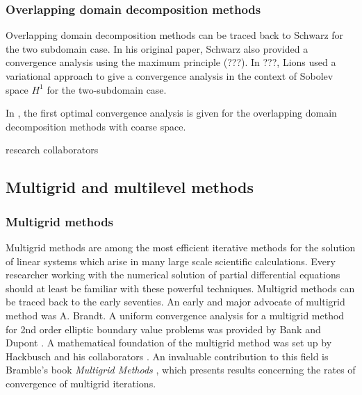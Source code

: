 \documentclass[CJK,11pt]{amsart}
\theoremstyle{definition}
\begin{document}
\begin{CJK*}{UTF8}{gbsn}
\subsubsection{Overlapping domain decomposition methods}
Overlapping domain decomposition methods can be traced back to Schwarz
\cite{} for the two subdomain case.  In his original paper, Schwarz
also provided a convergence analysis using the maximum principle (???).
In ???, Lions used a variational approach to give a convergence
analysis in the context of Sobolev space $H^1$ for the two-subdomain
case.


In \cite{bramble1991convergence-b}, the first optimal convergence
analysis is given for the overlapping domain decomposition methods
with coarse space.

 { research collaborators}

\subsection{Multigrid and multilevel methods}

\subsubsection{Multigrid methods}  Multigrid methods are among the most efficient iterative methods for
the solution of linear systems which arise in many large scale
scientific calculations. Every researcher working with the numerical
solution of partial differential equations should at least be familiar
with these powerful techniques. Multigrid methods can be traced back to
the early seventies.  An early and major advocate of multigrid
method was A. Brandt.   A uniform convergence analysis for
a multigrid method for 2nd order elliptic boundary value problems was
provided by Bank and Dupont \cite{}.  A mathematical foundation of the multigrid method
was set up by Hackbusch and his collaborators \cite{}. An invaluable contribution
to this field is Bramble's book {\it Multigrid Methods} \cite{bramble2019multigrid}, which 
presents results concerning the rates of convergence of multigrid iterations.


\end{CJK*}
\end{document}
